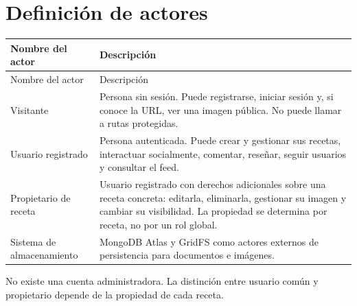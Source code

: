 \chapter{Definición de actores}
\label{ch:actores}

\begin{center}
\begin{longtable}{p{4cm}p{9.5cm}}
  \toprule
  Nombre del actor & Descripción \\
  \midrule
  \endfirsthead
  \toprule
  Nombre del actor & Descripción \\
  \midrule
  \endhead
  Visitante & Persona sin sesión. Puede registrarse, iniciar sesión y, si conoce la URL, ver una imagen pública. No puede llamar a rutas protegidas. \\
  Usuario registrado & Persona autenticada. Puede crear y gestionar sus recetas, interactuar socialmente, comentar, reseñar, seguir usuarios y consultar el feed. \\
  Propietario de receta & Usuario registrado con derechos adicionales sobre una receta concreta: editarla, eliminarla, gestionar su imagen y cambiar su visibilidad. La propiedad se determina por receta, no por un rol global. \\
  Sistema de almacenamiento & MongoDB Atlas y GridFS como actores externos de persistencia para documentos e imágenes. \\
  \bottomrule
\end{longtable}
\end{center}

No existe una cuenta administradora. La distinción entre usuario común y propietario depende de la propiedad de cada receta.
